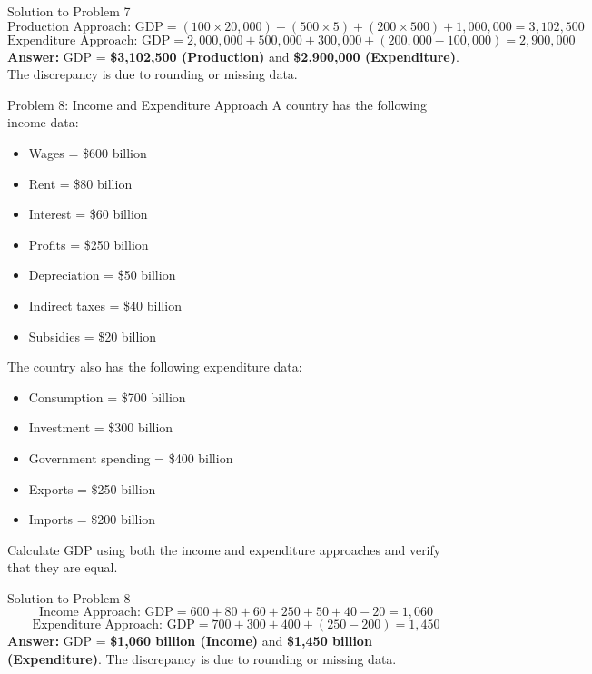 \documentclass{beamer}
\begin{document}
\begin{frame}{Solution to Problem 7}
\[
\text{Production Approach: GDP} = (100 \times 20,000) + (500 \times 5) + (200 \times 500) + 1,000,000 = 3,102,500
\]
\[
\text{Expenditure Approach: GDP} = 2,000,000 + 500,000 + 300,000 + (200,000 - 100,000) = 2,900,000
\]
\textbf{Answer:} GDP = \textbf{\$3,102,500 (Production)} and \textbf{\$2,900,000 (Expenditure)}. The discrepancy is due to rounding or missing data.
\end{frame}

\begin{frame}{Problem 8: Income and Expenditure Approach}
A country has the following income data:
\begin{itemize}
    \item Wages = \$600 billion
    \item Rent = \$80 billion
    \item Interest = \$60 billion
    \item Profits = \$250 billion
    \item Depreciation = \$50 billion
    \item Indirect taxes = \$40 billion
    \item Subsidies = \$20 billion
\end{itemize}
The country also has the following expenditure data:
\begin{itemize}
    \item Consumption = \$700 billion
    \item Investment = \$300 billion
    \item Government spending = \$400 billion
    \item Exports = \$250 billion
    \item Imports = \$200 billion
\end{itemize}
Calculate GDP using both the income and expenditure approaches and verify that they are equal.
\end{frame}

\begin{frame}{Solution to Problem 8}
\[
\text{Income Approach: GDP} = 600 + 80 + 60 + 250 + 50 + 40 - 20 = 1,060
\]
\[
\text{Expenditure Approach: GDP} = 700 + 300 + 400 + (250 - 200) = 1,450
\]
\textbf{Answer:} GDP = \textbf{\$1,060 billion (Income)} and \textbf{\$1,450 billion (Expenditure)}. The discrepancy is due to rounding or missing data.
\end{frame}
\end{document}
